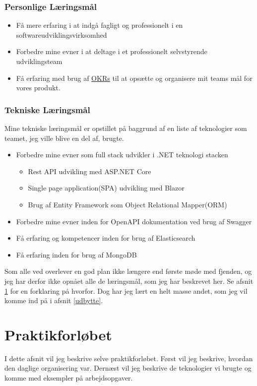 \documentclass[a4paper]{article}
\begin{document}
\subsubsection*{Personlige Læringsmål}
\label{personligelaeringsmaal}
\begin{itemize}
    \item Få mere erfaring i at indgå fagligt og professionelt i en 
    softwareudviklingsvirksomhed
    \item Forbedre mine evner i at deltage i et professionelt selvstyrende 
    udviklingsteam
    \item Få erfaring med brug af \href{https://en.wikipedia.org/wiki/OKR}{OKRs}
     til at opsætte og organisere mit teams mål for vores produkt.
\end{itemize}

\subsubsection*{Tekniske Læringsmål}
Mine tekniske læringsmål er opstillet på baggrund af en liste af teknologier
som teamet, jeg ville blive en del af, brugte.

\begin{itemize}
    \item Forbedre mine evner som full stack udvikler i .NET teknologi stacken
    \begin{itemize}
        \item Rest API udvikling med ASP.NET Core
        \item Single page application(SPA) udvikling med Blazor
        \item Brug af Entity Framework som Object Relational Mapper(ORM)
    \end{itemize}
    \item Forbedre mine evner inden for OpenAPI dokumentation ved brug af
    Swagger
    \item Få erfaring og kompetencer inden for brug af Elasticsearch
    \item Få erfaring inden for brug af MongoDB
\end{itemize}

Som alle ved overlever en god plan ikke længere end første møde med fjenden,
og jeg har derfor ikke opnået alle de læringsmål, som jeg har beskrevet her.
Se afsnit \ref{praktikforloeb} for en forklaring på hvorfor.
Dog har jeg lært en helt masse andet, 
som jeg vil komme ind på i afsnit \ref{udbytte}.

\newpage
\section{Praktikforløbet}
\label{praktikforloeb}
I dette afsnit vil jeg beskrive selve praktikforløbet.
Først vil jeg beskrive, hvordan den daglige organisering var.
Dernæst vil jeg beskrive de teknologier vi brugte og komme med eksempler på arbejdsopgaver.
\end{document}
